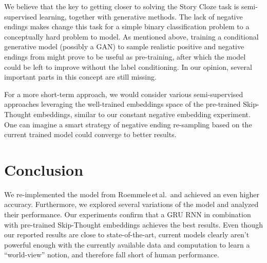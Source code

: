 \documentclass{article}
\begin{document}
We believe that the key to getting closer to solving the Story Cloze task is semi-supervised learning, together with generative methods. The lack of negative endings makes change this task for a simple binary classification problem to a conceptually hard problem to model. As mentioned above, training a conditional generative model (possibly a GAN) to sample realistic positive and negative endings from might prove to be useful as pre-training, after which the model could be left to improve without the label conditioning. In our opinion, several important parts in this concept are still missing.

For a more short-term approach, we would consider various semi-supervised approaches leveraging the well-trained embeddings space of the pre-trained Skip-Thought embeddings, similar to our constant negative embedding experiment. One can imagine a smart strategy of negative ending re-sampling based on the current trained model could converge to better results.

\section{Conclusion}\label{sec:conclusion}
We re-implemented the model from Roemmele\,et\,al.\,\citep{Roemmele2017AnTest} and achieved an even higher accuracy. Furthermore, we explored several variations of the model and analyzed their performance. Our experiments confirm that a GRU RNN in combination with pre-trained Skip-Thought embeddings achieves the best results. Even though our reported results are close to state-of-the-art, current models clearly aren't powerful enough with the currently available data and computation to learn a ``world-view'' notion, and therefore fall short of human performance.


\end{document}
